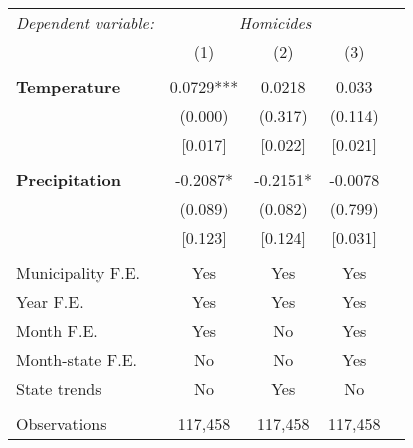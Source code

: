 \begin{tabular}{lcccc}
\hline\hline
\multicolumn{1}{l}{\textit{Dependent variable:}} &\multicolumn{3}{c}{\textit{Homicides}} \\

\cmidrule(lr){1-1}  \cmidrule(lr){2-4} 

&\multicolumn{1}{c}{(1)}&\multicolumn{1}{c}{(2)}&\multicolumn{1}{c}{(3)}\\

\\

\textbf{Temperature}  &  0.0729*** & 0.0218 & 0.033  \\
& (0.000) & (0.317) & (0.114) \\								
&  [0.017] & [0.022] & [0.021]\\
\\
  
\textbf{Precipitation} & -0.2087* & -0.2151* & -0.0078 \\
& (0.089) & (0.082) & (0.799)\\	
& [0.123] & [0.124] & [0.031]\\
\\

Municipality F.E. & Yes & Yes & Yes \\
Year F.E. & Yes & Yes & Yes \\ 
Month F.E. & Yes & No & Yes \\
Month-state F.E. & No & No & Yes \\
State trends & No & Yes & No \\
\\
Observations & 117,458 & 117,458 & 117,458 \\
\hline\hline
\end{tabular}